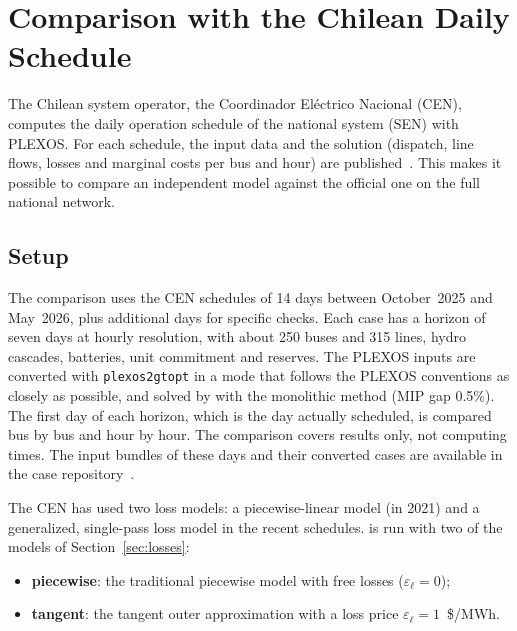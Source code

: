 
\section{Comparison with the Chilean Daily Schedule}
\label{sec:cases}

The Chilean system operator, the Coordinador El\'ectrico Nacional (CEN),
computes the daily operation schedule of the national system (SEN) with
PLEXOS.  For each schedule, the input data and the solution (dispatch,
line flows, losses and marginal costs per bus and hour) are
published~\cite{cen_pcp}.
This makes it possible to compare an independent model against the
official one on the full national network.

\subsection{Setup}

The comparison uses the CEN schedules of 14 days between October~2025
and May~2026,
plus additional days for specific checks.  Each case has a horizon of
seven days at hourly resolution, with about 250 buses and 315 lines,
hydro cascades, batteries, unit commitment and reserves.  The PLEXOS
inputs are converted with \texttt{plexos2gtopt} in a mode that follows
the PLEXOS conventions as closely as possible, and solved by \gtopt{}
with the monolithic method (MIP gap 0.5\%).  The first day
of each horizon, which is the day actually scheduled, is compared bus
by bus and hour by hour.  The comparison covers results only, not
computing times.  The input bundles of these days and their converted
\gtopt{} cases are available in the case repository~\cite{gtoptcases}.

The CEN has used two loss models: a piecewise-linear model (in 2021) and
a generalized, single-pass loss model in the recent schedules.  \gtopt{}
is run with two of the models of Section~\ref{sec:losses}:
\begin{itemize}
  \item \textbf{piecewise}: the traditional piecewise model with free
    losses ($\varepsilon_\ell = 0$);
  \item \textbf{tangent}: the tangent outer approximation with a loss
    price $\varepsilon_\ell = 1$~\$/MWh.
\end{itemize}

